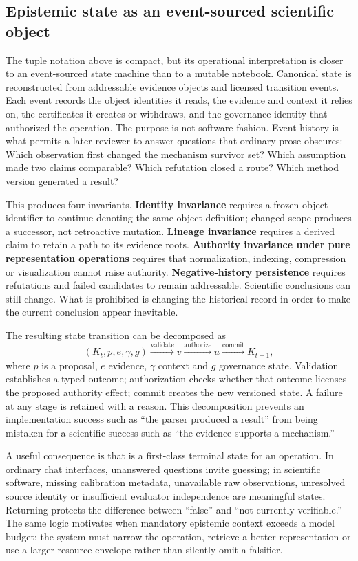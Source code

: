 \subsection{Epistemic state as an event-sourced scientific object}

The tuple notation above is compact, but its operational interpretation is closer to an event-sourced state machine than to a mutable notebook. Canonical state is reconstructed from addressable evidence objects and licensed transition events. Each event records the object identities it reads, the evidence and context it relies on, the certificates it creates or withdraws, and the governance identity that authorized the operation. The purpose is not software fashion. Event history is what permits a later reviewer to answer questions that ordinary prose obscures: Which observation first changed the mechanism survivor set? Which assumption made two claims comparable? Which refutation closed a route? Which method version generated a result?

This produces four invariants. \textbf{Identity invariance} requires a frozen object identifier to continue denoting the same object definition; changed scope produces a successor, not retroactive mutation. \textbf{Lineage invariance} requires a derived claim to retain a path to its evidence roots. \textbf{Authority invariance under pure representation operations} requires that normalization, indexing, compression or visualization cannot raise authority. \textbf{Negative-history persistence} requires refutations and failed candidates to remain addressable. Scientific conclusions can still change. What is prohibited is changing the historical record in order to make the current conclusion appear inevitable.

The resulting state transition can be decomposed as
\[
(K_t,p,e,\gamma,g)
\overset{\mathrm{validate}}{\longrightarrow}
v
\overset{\mathrm{authorize}}{\longrightarrow}
u
\overset{\mathrm{commit}}{\longrightarrow}
K_{t+1},
\]
where \(p\) is a proposal, \(e\) evidence, \(\gamma\) context and \(g\) governance state. Validation establishes a typed outcome; authorization checks whether that outcome licenses the proposed authority effect; commit creates the new versioned state. A failure at any stage is retained with a reason. This decomposition prevents an implementation success such as ``the parser produced a result'' from being mistaken for a scientific success such as ``the evidence supports a mechanism.''

A useful consequence is that \CannotCheck{} is a first-class terminal state for an operation. In ordinary chat interfaces, unanswered questions invite guessing; in scientific software, missing calibration metadata, unavailable raw observations, unresolved source identity or insufficient evaluator independence are meaningful states. Returning \CannotCheck{} protects the difference between ``false'' and ``not currently verifiable.'' The same logic motivates \CannotCompile{} when mandatory epistemic context exceeds a model budget: the system must narrow the operation, retrieve a better representation or use a larger resource envelope rather than silently omit a falsifier.

